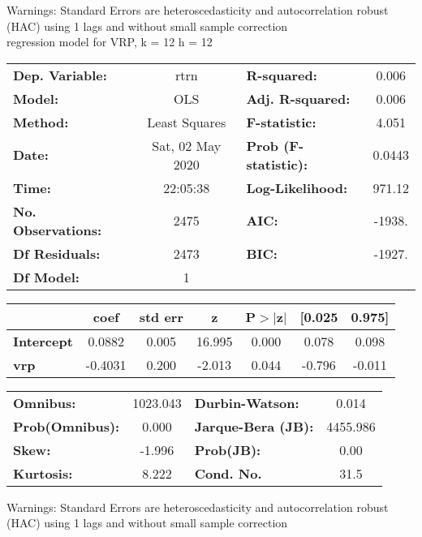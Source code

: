 Warnings: \newline
 [1] Standard Errors are heteroscedasticity and autocorrelation robust (HAC) using 1 lags and without small sample correction\\ 

regression model for VRP, k = 12 h = 12\begin{center}
\begin{tabular}{lclc}
\toprule
\textbf{Dep. Variable:}    &       rtrn       & \textbf{  R-squared:         } &     0.006   \\
\textbf{Model:}            &       OLS        & \textbf{  Adj. R-squared:    } &     0.006   \\
\textbf{Method:}           &  Least Squares   & \textbf{  F-statistic:       } &     4.051   \\
\textbf{Date:}             & Sat, 02 May 2020 & \textbf{  Prob (F-statistic):} &   0.0443    \\
\textbf{Time:}             &     22:05:38     & \textbf{  Log-Likelihood:    } &    971.12   \\
\textbf{No. Observations:} &        2475      & \textbf{  AIC:               } &    -1938.   \\
\textbf{Df Residuals:}     &        2473      & \textbf{  BIC:               } &    -1927.   \\
\textbf{Df Model:}         &           1      & \textbf{                     } &             \\
\bottomrule
\end{tabular}
\begin{tabular}{lcccccc}
                   & \textbf{coef} & \textbf{std err} & \textbf{z} & \textbf{P$> |$z$|$} & \textbf{[0.025} & \textbf{0.975]}  \\
\midrule
\textbf{Intercept} &       0.0882  &        0.005     &    16.995  &         0.000        &        0.078    &        0.098     \\
\textbf{vrp}       &      -0.4031  &        0.200     &    -2.013  &         0.044        &       -0.796    &       -0.011     \\
\bottomrule
\end{tabular}
\begin{tabular}{lclc}
\textbf{Omnibus:}       & 1023.043 & \textbf{  Durbin-Watson:     } &    0.014  \\
\textbf{Prob(Omnibus):} &   0.000  & \textbf{  Jarque-Bera (JB):  } & 4455.986  \\
\textbf{Skew:}          &  -1.996  & \textbf{  Prob(JB):          } &     0.00  \\
\textbf{Kurtosis:}      &   8.222  & \textbf{  Cond. No.          } &     31.5  \\
\bottomrule
\end{tabular}
\end{center}

Warnings: \newline
 [1] Standard Errors are heteroscedasticity and autocorrelation robust (HAC) using 1 lags and without small sample correction\\ 

